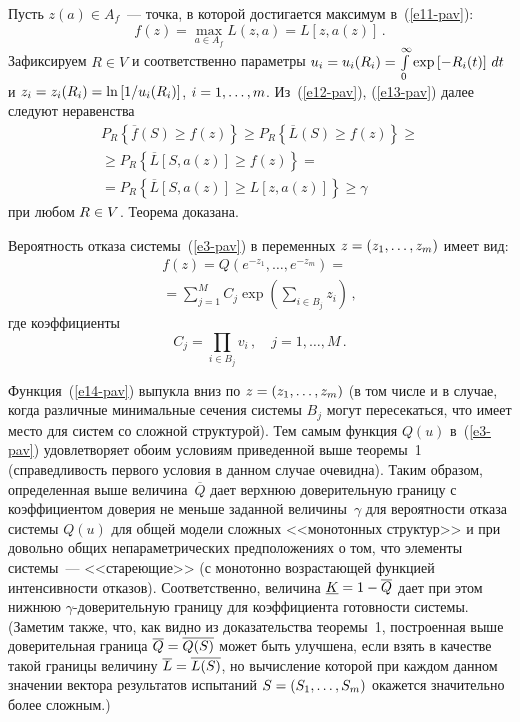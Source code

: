 \begin{multicols}{2}
Пусть $z(a)\in A_f$~--- точка, в которой достигается максимум 
в~(\ref{e11-pav}):
\begin{equation}
f(z) =\max\limits_{a\in A_f} L(z,a) =L[z,a(z)]\,.
\label{e13-pav}
\end{equation}
Зафиксируем $R\in V$  и соответственно параметры $u_i\hm= u_i(R_i) \hm= 
\int\limits_0^\infty \exp \left[ -R_i(t)\right]\,dt$ и $z_i\hm= z_i(R_i) \hm= \ln \left[ 
1/u_i(R_i)\right]$, $i\hm=1,\ldots ,m$. Из~(\ref{e12-pav}), (\ref{e13-pav}) далее 
следуют неравенства 
\begin{multline*}
P_R \left\{ \overline{f}(S)\geq f(z)\right\} \geq P_R\left\{ \overline{L}(S)\geq 
f(z)\right\} \geq{}\\
{}\geq
 P_R\left\{ \overline{L}[S,a(z)]\geq f(z)\right\} ={}\\
{}= P_R\left\{ \overline{L}[S,a(z)]\geq L[z,a(z)]\right\}\geq \gamma
\end{multline*}
при любом $R\hm\in V$. Теорема доказана.

\medskip

     Вероятность отказа системы~(\ref{e3-pav}) в переменных $z\hm= 
(z_1,\ldots ,z_m)$ имеет вид:
     \begin{multline}
     f(z) = Q \left(e^{-z_1},\ldots , e^{-z_m}\right) = {}\\
     {}=\sum\limits_{j=1}^M C_j 
\exp \left( \sum\limits_{i\in B_j} z_i\right)\,,
     \label{e14-pav}
     \end{multline}
где коэффициенты 
$$
C_j=\prod\limits_{i\in B_j} v_i\,,\quad j=1,\ldots , M\,.
$$
     
     Функция~(\ref{e14-pav}) выпукла вниз по $z\hm= (z_1,\ldots ,z_m)$ (в 
том числе и в случае, когда различные минимальные сечения системы $B_j$ 
могут пересекаться, что имеет место для систем со сложной структурой). Тем 
самым функция $Q(u)$ в~(\ref{e3-pav}) удовлетворяет обоим условиям 
приведенной выше теоремы~1 (справедливость первого условия в данном 
случае очевидна). Таким образом, определенная выше 
величина~$\overline{Q}$ дает верхнюю доверительную границу с 
коэффициентом доверия не меньше заданной величины~$\gamma$  для 
вероятности отказа системы $Q(u)$ для общей модели сложных 
<<монотонных структур>> и при довольно общих непараметрических 
предположениях о том, что элементы системы~--- <<стареющие>> (с 
монотонно возрастающей функцией интенсивности отказов). 
Соответственно, величина $\underline{K}\hm=1-\overline{Q}$ дает при этом 
нижнюю 
     $\gamma$-до\-ве\-ри\-тель\-ную границу для коэффициента готовности 
системы. (Заметим также, что, как видно из доказательства теоремы~1, 
построенная выше доверительная граница $\overline{Q}\hm=\overline{Q(S)}$  
может быть улучшена, если взять в качестве такой границы величину 
$\overline{L}\hm=\overline{L(S)}$, но вычисление которой при каждом 
данном значении вектора результатов испытаний $S\hm=(S_1,\ldots , S_m)$ 
окажется значительно более сложным.) 


\end{multicols}
